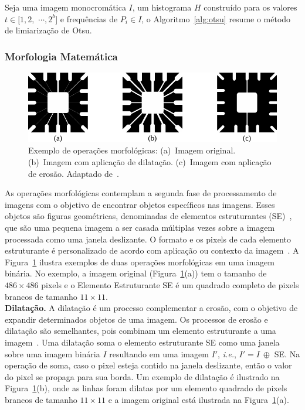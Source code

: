 Seja uma imagem monocromática $I$, um histograma $H$ construído para os valores $t \in [1, 2,$ $\cdots, 2^b]$ e frequências de $P_i \in I$, o Algoritmo~\ref{alg:otsu} resume o método de limiarização de Otsu.

\subsubsection{Morfologia Matemática}

\begin{figure}[!b]
    \centering
    \includegraphics[scale=1]{_fig/wirebond.pdf}
    \caption[Exemplo de operações morfológicas.]{Exemplo de operações morfológicas:  
    (a)~Imagem original. 
    (b)~Imagem com aplicação de dilatação. 
    (c)~Imagem com aplicação de erosão.
    Adaptado de~.}
    \label{figWirebond}
\end{figure}

As operações morfológicas contemplam a segunda fase de processamento de imagens com o objetivo de encontrar objetos específicos nas imagens.
Esses objetos são figuras geométricas, denominadas de elementos estruturantes (SE)~\cite{Zhang2011}, que são uma pequena imagem a ser casada múltiplas vezes sobre a imagem processada como uma janela deslizante.
O formato e os pixels de cada elemento estruturante é personalizado de acordo com aplicação ou contexto da imagem~\cite{Gonzalez2008}.
A Figura~\ref{figWirebond} ilustra exemplos de duas operações morfológicas em uma imagem binária. 
No exemplo, a imagem original (Figura~\ref{figWirebond}(a)) tem o tamanho de $486 \times 486$ pixels e o Elemento Estruturante SE é um quadrado completo de pixels brancos de tamanho $11 \times 11$.\\

\noindent
\textbf{Dilatação.}
A dilatação é um processo complementar a erosão, com o objetivo de expandir determinados objetos de uma imagem.
Os processos de erosão e dilatação são semelhantes, pois combinam um elemento estruturante a uma imagem~\cite{Sonka1993}.
Uma dilatação soma o elemento estruturante SE como uma janela sobre uma imagem binária $I$ resultando em uma imagem $I'$, \textit{i.e.}, $I' = I ~\oplus$ SE.
Na operação de soma, caso o pixel esteja contido na janela deslizante, então o valor do pixel se propaga para sua borda.
Um exemplo de dilatação é ilustrado na Figura~\ref{figWirebond}(b), onde as linhas foram dilatas por um elemento quadrado de pixels brancos de tamanho $11 \times 11$ e a imagem original está ilustrada na Figura~\ref{figWirebond}(a).\\

